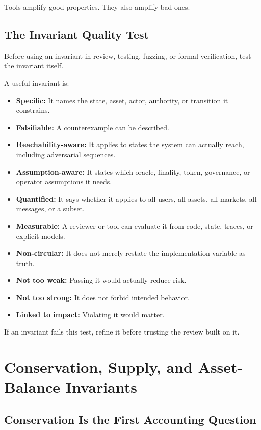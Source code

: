 Tools amplify good properties. They also amplify bad ones.

\subsection{The Invariant Quality Test}

Before using an invariant in review, testing, fuzzing, or formal
verification, test the invariant itself.

A useful invariant is:

\begin{itemize}
\tightlist
\item
  \textbf{Specific:} It names the state, asset, actor, authority, or
  transition it constrains.
\item
  \textbf{Falsifiable:} A counterexample can be described.
\item
  \textbf{Reachability-aware:} It applies to states the system can
  actually reach, including adversarial sequences.
\item
  \textbf{Assumption-aware:} It states which oracle, finality, token,
  governance, or operator assumptions it needs.
\item
  \textbf{Quantified:} It says whether it applies to all users, all
  assets, all markets, all messages, or a subset.
\item
  \textbf{Measurable:} A reviewer or tool can evaluate it from code,
  state, traces, or explicit models.
\item
  \textbf{Non-circular:} It does not merely restate the implementation
  variable as truth.
\item
  \textbf{Not too weak:} Passing it would actually reduce risk.
\item
  \textbf{Not too strong:} It does not forbid intended behavior.
\item
  \textbf{Linked to impact:} Violating it would matter.
\end{itemize}

If an invariant fails this test, refine it before trusting the review
built on it.

\section{Conservation, Supply, and Asset-Balance Invariants}

\subsection{Conservation Is the First Accounting Question}

